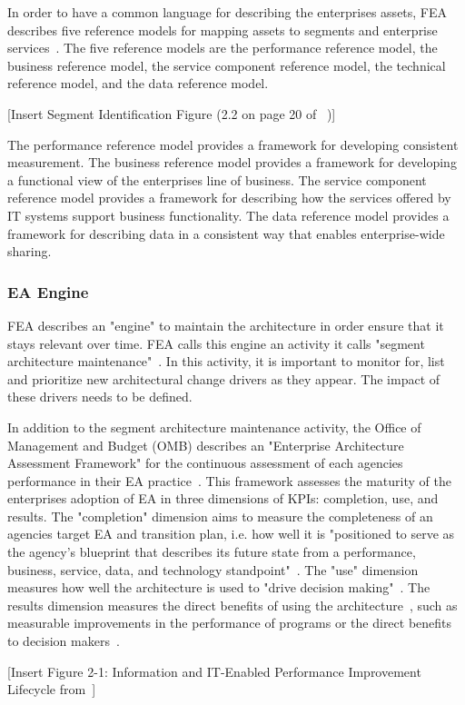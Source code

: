 In order to have a common language for describing the enterprises assets, FEA describes five reference models for mapping assets to segments and enterprise services~\cite{FederalEnterpriseArchitectureProgramManagementOffice}. The five reference models are the performance reference model, the business reference model, the service component reference model, the technical reference model, and the data reference model. 

[Insert Segment Identification Figure (2.2 on page 20 of ~\cite{FederalEnterpriseArchitectureProgramManagementOffice})]

The performance reference model provides a framework for developing consistent measurement. The business reference model provides a framework for developing a functional view of the enterprises line of business. The service component reference model provides a framework for describing how the services offered by IT systems support business functionality.  The data reference model provides a framework for describing data in a consistent way that enables enterprise-wide sharing. 

\subsubsection{EA Engine}

FEA describes an "engine" to maintain the architecture in order ensure that it stays relevant over time. FEA calls this engine an activity it calls "segment architecture maintenance"~\cite{FederalEnterpriseArchitectureProgramManagementOffice}. In this activity, it is important to monitor for, list and prioritize new architectural change drivers as they appear. The impact of these drivers needs to be defined. 



In addition to the segment architecture maintenance activity, the Office of Management and Budget (OMB) describes an "Enterprise Architecture Assessment Framework" for the continuous assessment of each agencies performance in their EA practice~\cite{OfficeofManagementandBudget}. This framework assesses the maturity of the enterprises adoption of EA in three dimensions of KPIs: completion, use, and results. The "completion" dimension aims to measure the completeness of an agencies target EA and transition plan, i.e. how well it is "positioned to serve  as the agency's blueprint that describes its future state from a performance, business, service, data, and technology standpoint"~\cite{OfficeofManagementandBudget}. The "use" dimension measures how well the architecture is used to "drive decision making"~\cite{sessions2007}. The results dimension measures the direct benefits of using the architecture~\cite{sessions2007}, such as measurable improvements in the performance of programs or the direct benefits to decision makers~\cite{OfficeofManagementandBudget}. 

[Insert Figure 2-1: Information and IT-Enabled Performance Improvement Lifecycle from~\cite{OfficeofManagementandBudget}]

